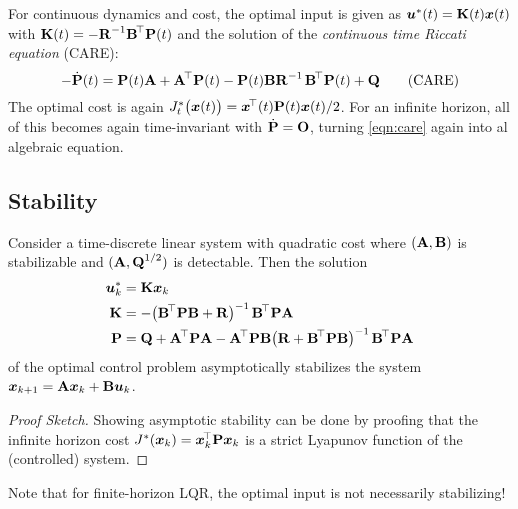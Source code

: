 			For continuous dynamics and cost, the optimal input is given as \( \bm{u}^\ast(t) = \bm{\mathrm{K}}(t) \bm{x}(t) \) with \( \bm{\mathrm{K}}(t) = -\bm{\mathrm{R}}^{-1} \bm{\mathrm{B}}^{\!\top} \bm{\mathrm{P}}(t)\) and the solution of the \emph{continuous time Riccati equation} (CARE):
			\begin{equation}
				-\dot{\bm{\mathrm{P}}}(t) = \bm{\mathrm{P}}(t) \bm{\mathrm{A}} + \bm{\mathrm{A}}^{\!\top} \bm{\mathrm{P}}(t) - \bm{\mathrm{P}}(t) \bm{\mathrm{B}} \bm{\mathrm{R}}^{-1\,} \bm{\mathrm{B}}^{\!\top} \bm{\mathrm{P}}(t) + \bm{\mathrm{Q}}  \tag{CARE}\label{eqn:care}
			\end{equation}
			The optimal cost is again \( J_t^\ast\bigl(\bm{x}(t)\bigr) = \bm{x}^{\!\top}(t) \bm{\mathrm{P}}(t) \bm{x}(t) / 2 \). For an infinite horizon, all of this becomes again time-invariant with \( \dot{\bm{\mathrm{P}}} = \bm{\mathrm{O}} \), turning \eqref{eqn:care} again into al algebraic equation.

		\subsection{Stability}
			\begin{theorem}
				Consider a time-discrete linear system with quadratic cost where \( (\bm{\mathrm{A}}, \bm{\mathrm{B}}) \) is stabilizable and \( (\bm{\mathrm{A}}, \bm{\mathrm{Q}}^{1/2}) \) is detectable. Then the solution
				\begin{align}
					\bm{u}_k^\ast &= \bm{\mathrm{K}} \bm{x}_k \\
					\bm{\mathrm{K}} &= -\bigl( \bm{\mathrm{B}}^{\!\top} \bm{\mathrm{P}} \bm{\mathrm{B}} + \bm{\mathrm{R}} \bigr)^{-1\,} \bm{\mathrm{B}}^{\!\top} \bm{\mathrm{P}} \bm{\mathrm{A}} \\
					\bm{\mathrm{P}} &= \bm{\mathrm{Q}} + \bm{\mathrm{A}}^{\!\top} \bm{\mathrm{P}} \bm{\mathrm{A}} - \bm{\mathrm{A}}^{\!\top} \bm{\mathrm{P}} \bm{\mathrm{B}} \bigl( \bm{\mathrm{R}} + \bm{\mathrm{B}}^{\!\top} \bm{\mathrm{P}} \bm{\mathrm{B}} \bigr)^{-1\,} \bm{\mathrm{B}}^{\!\top} \bm{\mathrm{P}} \bm{\mathrm{A}}
				\end{align}
				of the optimal control problem asymptotically stabilizes the system \( \bm{x}_{k + 1} = \bm{\mathrm{A}} \bm{x}_k + \bm{\mathrm{B}} \bm{u}_k \).
			\end{theorem}
			\begin{proof}[Proof Sketch]
				Showing asymptotic stability can be done by proofing that the infinite horizon cost \( J^\ast(\bm{x}_k) = \bm{x}_k^{\!\top} \bm{\mathrm{P}} \bm{x}_k \) is a strict Lyapunov function of the (controlled) system.
			\end{proof}

			Note that for finite-horizon LQR, the optimal input is not necessarily stabilizing!

